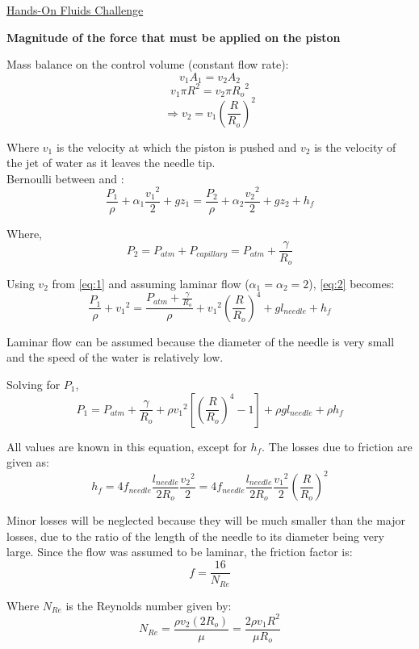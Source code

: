 \documentclass{article}
\newcommand*\circled[1]{\tikz[baseline=(char.base)]{
            \node[shape=circle,draw,inner sep=2pt] (char) {#1};}}
\begin{document}
\begin{center}\underline{\huge Hands-On Fluids Challenge}\end{center}

\textbf{Magnitude of the force that must be applied on the piston}

Mass balance on the control volume (constant flow rate):
\[ v_{1}A_{1} = v_{2}A_{2} \]
\[ v_{1}\pi{R}^2 = v_{2}\pi{R_{o}}^2 \]
\[ \Rightarrow v_{2} = v_{1} \left(\frac{R}{R_{o}}\right)^2 \tag{1} \label{eq:1} \]

Where $v_{1}$ is the velocity at which the piston is pushed and $v_{2}$ is the velocity of the jet of water as it leaves the needle tip. \\

Bernoulli between \circled{1} and \circled{2}:
\[ \frac{P_{1}}{\rho} + \alpha_{1}\frac{{v_{1}}^2}{2}  + gz_{1} = \frac{P_{2}}{\rho} + \alpha_{2}\frac{{v_{2}}^2}{2}  + gz_{2} + h_{f} \tag{2} \label{eq:2} \]

Where,
\[ P_{2} = P_{atm} + P_{capillary}  = P_{atm} + \frac{\gamma}{R_{o}} \]


Using $v_{2}$ from \eqref{eq:1} and assuming laminar flow ($\alpha_{1} = \alpha_{2} = 2$), \eqref{eq:2} becomes:
\[ \frac{P_{1}}{\rho} + {v_{1}}^2 = \frac{P_{atm} + \frac{\gamma}{R_{o}}}{\rho} + {v_{1}}^2\left(\frac{R}{R_{o}}\right)^4  + gl_{needle} + h_{f} \]

Laminar flow can be assumed because the diameter of the needle is very small and the speed of the water is relatively low.

Solving for $P_{1}$,
\[ P_{1} = P_{atm} + \frac{\gamma}{R_{o}} + \rho{v_{1}}^2\left[\left(\frac{R}{R_{o}}\right)^4  - 1 \right] + \rho gl_{needle} + \rho h_{f} \tag{3} \label{eq:3} \]

All values are known in this equation, except for $h_{f}$. The losses due to friction are given as:
\[ h_{f} = 4f_{needle} \frac{l_{needle}}{2R_{o}} \frac{{v_{2}}^2}{2} = 4f_{needle} \frac{l_{needle}}{2R_{o}} \frac{{v_{1}}^2}{2} \left(\frac{R}{R_{o}}\right)^2 \tag{4} \label{eq:4} \]

Minor losses will be neglected because they will be much smaller than the major losses, due to the ratio of the length of the needle to its diameter being very large. Since the flow was assumed to be laminar, the friction factor is:
\[ f = \frac{16}{N_{Re}} \tag{5} \label{eq:5} \]

Where $N_{Re}$ is the Reynolds number given by:
\[ N_{Re} = \frac{\rho v_{2} (2R_{o})}{\mu} = \frac{2 \rho v_{1} R^{2}}{\mu R_{o}} \tag{6} \label{eq:6} \]
\end{document}
